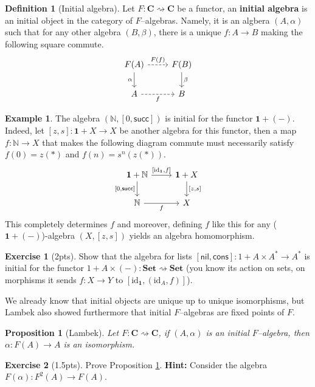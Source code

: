 \documentclass{article}
\newtheorem{prop}[thm]{Proposition}
\theoremstyle{definition}
\newtheorem{defn}[thm]{Definition}
\newtheorem{exmp}[thm]{Example}
\newtheorem{exer}{Exercise}
\theoremstyle{remark}
\newcommand{\N}{\mathbb{N}}
\newcommand{\id}{\text{id}}
\renewcommand{\succ}{\textsf{succ}}
\begin{document}
\begin{defn}[Initial algebra]\label{initalg}
	Let $F:\mathbf{C}\rightsquigarrow \mathbf{C}$ be a functor, an \textbf{initial algebra} is an initial object in the category of $F$--algebras. Namely, it is an algbera $(A, \alpha)$ such that for any other algebra $(B, \beta)$, there is a unique $f : A\rightarrow B$ making the following square commute.
	\begin{equation}\label{diag-initalg}
		\centering
		\begin{tikzcd}
			F(A) \arrow[d, "\alpha"'] \arrow[r, dashed, "F(f)"] & F(B) \arrow[d, "\beta"] \\
			A \arrow[r, dashed, "f"']                           & B                       
		\end{tikzcd}
	\end{equation}
\end{defn}
\begin{exmp}
    The algebra $(\N, [0,\succ])$ is initial for the functor $\mathbf{1} + (-)$. Indeed, let $[z,s]:\mathbf{1}+X \rightarrow X$ be another algebra for this functor, then a map $f:\N\rightarrow X$ that makes the following diagram commute must necessarily satisfy $f(0) = z(\ast)$ and $f(n) = s^n(z(\ast))$.
    \begin{equation}\label{diag-initN}
        \centering
        \begin{tikzcd}
            \mathbf{1}+\N \arrow[d, "{[0,\succ]}"'] \arrow[r, "{[\id_{\mathbf{1}}, f]}"] & \mathbf{1}+X \arrow[d, "{[z,s]}"] \\
            \N \arrow[r, "f"']                           & X                       
        \end{tikzcd}
    \end{equation}
    This completely determines $f$ and moreover, defining $f$ like this for any ($\mathbf{1} + (-)$)-algebra $(X,[z,s])$ yields an algebra homomorphism. 
\end{exmp}
\begin{exer}[2pts]\label{exer-initAlg}
    Show that the algebra for lists $[\textsf{nil}, \textsf{cons}]: 1 + A \times A^* \rightarrow A^*$ is initial for the functor $1+A \times (-): \textbf{Set}\rightsquigarrow \textbf{Set}$ (you know its action on sets, on morphisms it sends $f:X \rightarrow Y$ to $[\id_{\mathbf{1}}, (\id_A, f)]$).
\end{exer}
We already know that initial objects are unique up to unique isomorphisms, but Lambek also showed furthermore that initial $F$--algebras are fixed points of $F$.
\begin{prop}[Lambek]\label{initialiso}
	Let $F:\mathbf{C}\rightsquigarrow \mathbf{C}$, if $(A,\alpha)$ is an initial $F$--algebra, then $\alpha:F(A)\rightarrow A$ is an isomorphism.
\end{prop}
\begin{exer}[1.5pts]
    Prove Proposition \ref{initialiso}. \textbf{Hint:} Consider the algebra $F(\alpha): F^2(A) \rightarrow F(A)$.
\end{exer}
\end{document}
